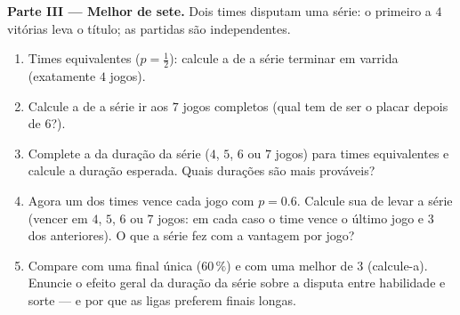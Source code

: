 \begin{problem}
\medskip
\noindent\textbf{Parte III --- Melhor de sete.}
Dois times disputam uma série: o primeiro a $4$ vitórias leva o
título; as partidas são independentes.
\begin{enumerate}[resume]
  \item Times equivalentes ($p = \frac12$): calcule a
         de a série terminar em varrida (exatamente
        $4$ jogos).
  \item Calcule a  de a série ir aos $7$ jogos
        completos (qual tem de ser o placar depois de $6$?).
  \item Complete a  da duração da série ($4$, $5$,
        $6$ ou $7$ jogos) para times equivalentes e calcule a
        duração esperada. Quais durações são mais prováveis?
  \item Agora um dos times vence cada jogo com $p = 0.6$.
        Calcule sua  de levar a série (vencer em
        $4$, $5$, $6$ ou $7$ jogos: em cada caso o time vence o
        último jogo e $3$ dos anteriores). O que a série fez com
        a vantagem por jogo?
  \item Compare com uma final única ($60\,\%$) e com uma melhor
        de 3 (calcule-a). Enuncie o efeito geral da duração da
        série sobre a disputa entre habilidade e sorte --- e por
        que as ligas preferem finais longas.
\end{enumerate}


\end{problem}
